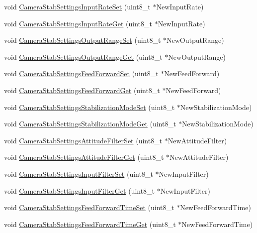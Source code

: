 \begin{DoxyCompactItemize}
\item 
void \hyperlink{group___camera_stab_settings_gab1de62a37075cb935ba4a997e9925001}{\-Camera\-Stab\-Settings\-Input\-Rate\-Set} (uint8\-\_\-t $\ast$\-New\-Input\-Rate)
\item 
void \hyperlink{group___camera_stab_settings_gaa49d85a81ea4e86b923be5ac64957920}{\-Camera\-Stab\-Settings\-Input\-Rate\-Get} (uint8\-\_\-t $\ast$\-New\-Input\-Rate)
\item 
void \hyperlink{group___camera_stab_settings_gaf6f4df81937862250833febd049e4847}{\-Camera\-Stab\-Settings\-Output\-Range\-Set} (uint8\-\_\-t $\ast$\-New\-Output\-Range)
\item 
void \hyperlink{group___camera_stab_settings_ga9faff8fcd0107d1bb14f48a10a807fac}{\-Camera\-Stab\-Settings\-Output\-Range\-Get} (uint8\-\_\-t $\ast$\-New\-Output\-Range)
\item 
void \hyperlink{group___camera_stab_settings_gabd08f518abc877384dd919874a05c5a9}{\-Camera\-Stab\-Settings\-Feed\-Forward\-Set} (uint8\-\_\-t $\ast$\-New\-Feed\-Forward)
\item 
void \hyperlink{group___camera_stab_settings_ga721ca48bf1fc3d012172b4b3c915667a}{\-Camera\-Stab\-Settings\-Feed\-Forward\-Get} (uint8\-\_\-t $\ast$\-New\-Feed\-Forward)
\item 
void \hyperlink{group___camera_stab_settings_gad4f5e04395a92f90725224aee8562d3f}{\-Camera\-Stab\-Settings\-Stabilization\-Mode\-Set} (uint8\-\_\-t $\ast$\-New\-Stabilization\-Mode)
\item 
void \hyperlink{group___camera_stab_settings_gae8bbed0f55103b2830cc6bc05296a25f}{\-Camera\-Stab\-Settings\-Stabilization\-Mode\-Get} (uint8\-\_\-t $\ast$\-New\-Stabilization\-Mode)
\item 
void \hyperlink{group___camera_stab_settings_ga05c09a49772b52aa43da955622e6c0a3}{\-Camera\-Stab\-Settings\-Attitude\-Filter\-Set} (uint8\-\_\-t $\ast$\-New\-Attitude\-Filter)
\item 
void \hyperlink{group___camera_stab_settings_gaddc057401c2cc604cb3af7fa5c96bd08}{\-Camera\-Stab\-Settings\-Attitude\-Filter\-Get} (uint8\-\_\-t $\ast$\-New\-Attitude\-Filter)
\item 
void \hyperlink{group___camera_stab_settings_gaeea937bd5e575b77b4d93a1b5cd82df4}{\-Camera\-Stab\-Settings\-Input\-Filter\-Set} (uint8\-\_\-t $\ast$\-New\-Input\-Filter)
\item 
void \hyperlink{group___camera_stab_settings_gad91a429b7b36cd75d4ad2c45e685b9d5}{\-Camera\-Stab\-Settings\-Input\-Filter\-Get} (uint8\-\_\-t $\ast$\-New\-Input\-Filter)
\item 
void \hyperlink{group___camera_stab_settings_gaea9157b07ac1ba078e8fbe74d015a2af}{\-Camera\-Stab\-Settings\-Feed\-Forward\-Time\-Set} (uint8\-\_\-t $\ast$\-New\-Feed\-Forward\-Time)
\item 
void \hyperlink{group___camera_stab_settings_ga1adf9d6584c0d7e3708da07c57036f77}{\-Camera\-Stab\-Settings\-Feed\-Forward\-Time\-Get} (uint8\-\_\-t $\ast$\-New\-Feed\-Forward\-Time)
\end{DoxyCompactItemize}


